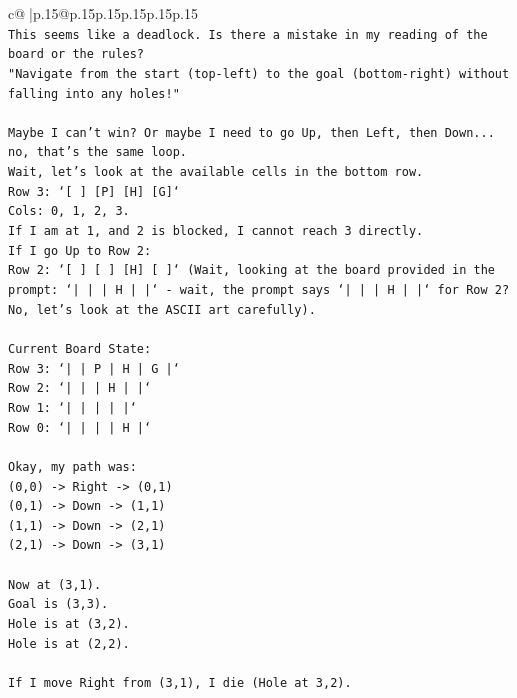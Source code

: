 \documentclass{article}
\begin{document}
{\begin{supertabular}{c@{$\;$}|p{.15\linewidth}@{}p{.15\linewidth}p{.15\linewidth}p{.15\linewidth}p{.15\linewidth}p{.15\linewidth}}
{{{\\ 
\texttt{This seems like a deadlock. Is there a mistake in my reading of the board or the rules?} \\
\texttt{"Navigate from the start (top{-}left) to the goal (bottom{-}right) without falling into any holes!"} \\
\\ 
\texttt{Maybe I can't win? Or maybe I need to go Up, then Left, then Down... no, that's the same loop.} \\
\texttt{Wait, let's look at the available cells in the bottom row.} \\
\texttt{Row 3: `{[} {]} {[}P{]} {[}H{]} {[}G{]}`} \\
\texttt{Cols: 0, 1, 2, 3.} \\
\texttt{If I am at 1, and 2 is blocked, I cannot reach 3 directly.} \\
\texttt{If I go Up to Row 2:} \\
\texttt{Row 2: `{[} {]} {[} {]} {[}H{]} {[} {]}` (Wait, looking at the board provided in the prompt: `| | | H | |` {-} wait, the prompt says `|     |     |  H  |     |` for Row 2? No, let's look at the ASCII art carefully).} \\
\\ 
\texttt{Current Board State:} \\
\texttt{Row 3: `|     |  P  |  H  |  G  |`} \\
\texttt{Row 2: `|     |     |  H  |     |`} \\
\texttt{Row 1: `|     |     |     |     |`} \\
\texttt{Row 0: `|     |     |     |  H  |`} \\
\\ 
\texttt{Okay, my path was:} \\
\texttt{(0,0) {-}> Right {-}> (0,1)} \\
\texttt{(0,1) {-}> Down {-}> (1,1)} \\
\texttt{(1,1) {-}> Down {-}> (2,1)} \\
\texttt{(2,1) {-}> Down {-}> (3,1)} \\
\\ 
\texttt{Now at (3,1).} \\
\texttt{Goal is (3,3).} \\
\texttt{Hole is at (3,2).} \\
\texttt{Hole is at (2,2).} \\
\\ 
\texttt{If I move Right from (3,1), I die (Hole at 3,2).} \\
}}}
\end{supertabular}}
\end{document}

